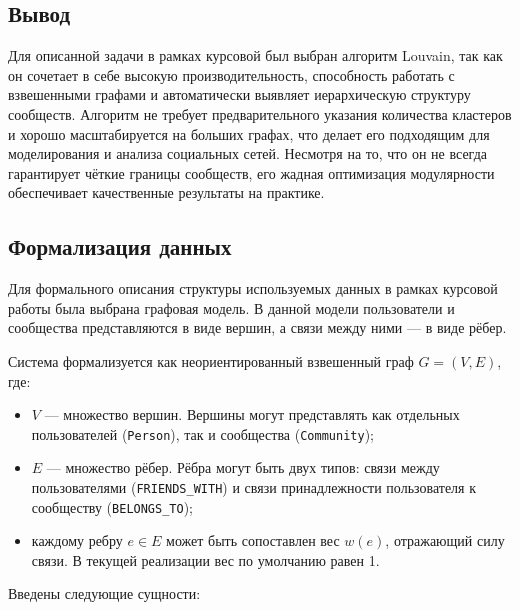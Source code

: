 \subsection{Вывод}

Для описанной задачи в рамках курсовой был выбран алгоритм Louvain, так как он сочетает в себе высокую производительность, способность работать с взвешенными графами и автоматически выявляет иерархическую структуру сообществ. Алгоритм не требует предварительного указания количества кластеров и хорошо масштабируется на больших графах, что делает его подходящим для моделирования и анализа социальных сетей. Несмотря на то, что он не всегда гарантирует чёткие границы сообществ, его жадная оптимизация модулярности обеспечивает качественные результаты на практике.

\subsection{Формализация данных}

Для формального описания структуры используемых данных в рамках курсовой работы была выбрана графовая модель. В данной модели пользователи и сообщества представляются в виде вершин, а связи между ними — в виде рёбер.

Система формализуется как неориентированный взвешенный граф $G = (V, E)$, где:

\begin{itemize}
    \item $V$ — множество вершин. Вершины могут представлять как отдельных пользователей (\texttt{Person}), так и сообщества (\texttt{Community});
    \item $E$ — множество рёбер. Рёбра могут быть двух типов: связи между пользователями (\texttt{FRIENDS\_WITH}) и связи принадлежности пользователя к сообществу (\texttt{BELONGS\_TO});
    \item каждому ребру $e \in E$ может быть сопоставлен вес $w(e)$, отражающий силу связи. В текущей реализации вес по умолчанию равен 1.
\end{itemize}

Введены следующие сущности:

